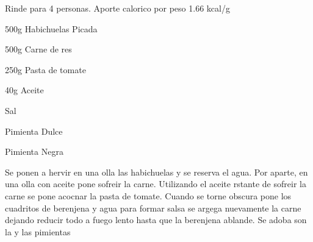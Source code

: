 
Rinde para 4 personas.
Aporte calorico por peso 1.66 kcal/g

\begin{ingredientes}
\item 500g Habichuelas Picada
\item 500g Carne de res
\item 250g Pasta de tomate
\item 40g Aceite
\item Sal
\item Pimienta Dulce
\item Pimienta Negra
\end{ingredientes}
\preparacion

Se ponen a hervir en una olla las habichuelas y se reserva el agua. Por aparte, en una olla con aceite pone sofreir la carne. Utilizando el aceite rstante de sofreir la carne se pone acocnar la pasta de tomate. Cuando se torne obscura pone los cuadritos de berenjena y agua para formar salsa se argega nuevamente la carne dejando reducir todo a fuego lento hasta que la berenjena ablande. Se adoba son la y las pimientas


